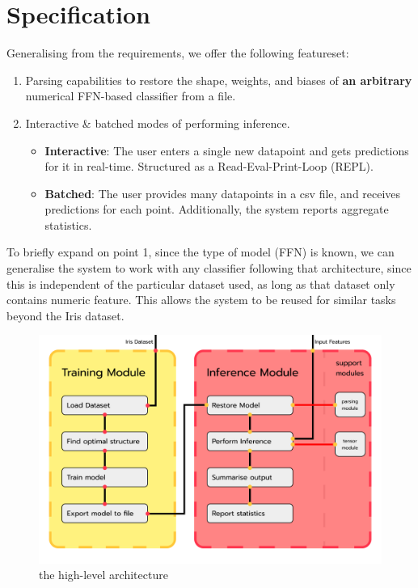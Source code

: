\documentclass[12pt]{article}
\begin{document}
\section{Specification}
Generalising from the requirements, we offer the following featureset:
\begin{enumerate}
	\item Parsing capabilities to restore the shape, weights, and biases of \textbf{an arbitrary} numerical FFN-based classifier from a file.
	\item Interactive \& batched modes of performing inference. \begin{itemize}
		\item \textbf{Interactive}: The user enters a single new datapoint and gets predictions for it in real-time. Structured as a Read-Eval-Print-Loop (REPL).
		\item \textbf{Batched}: The user provides many datapoints in a csv file, and receives predictions for each point. Additionally, the system reports aggregate statistics.
	\end{itemize}
\end{enumerate}
To briefly expand on point 1, since the type of model (FFN) is known, we can generalise the system to work with any classifier following that architecture, since this is independent of the particular dataset used, as long as that dataset only contains numeric feature. This allows the system to be reused for similar tasks beyond the Iris dataset.\bigskip

\begin{figure}
	\includegraphics[width=0.85\pdfpagewidth]{../images/modules.png}
	\caption{the high-level architecture}
\end{figure}
\end{document}
